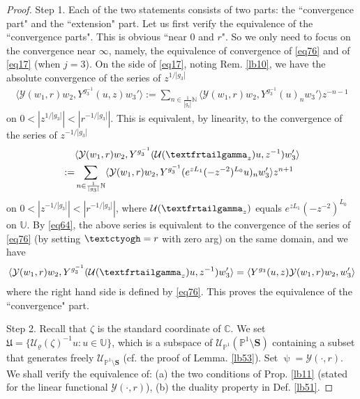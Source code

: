 \documentclass[11pt,b5paper,notitlepage]{article}
\theoremstyle{definition}
\theoremstyle{plain}
\newcommand{\fk}{\mathfrak}
\newcommand{\mc}{\mathcal}
\newcommand{\bk}[1]{\langle {#1}\rangle}
\newcommand{\scr}{\mathscr}
\newcommand{\Ubb}{\mathbb U}
\newcommand{\Cbb}{\mathbb C}
\newcommand{\Nbb}{\mathbb N}
\newcommand{\Pbb}{\mathbb P}
\newcommand{\Sbf}{\mathbf{S}}
\newcommand{\tipaz}{\text{\textctyogh}}
\newcommand{\tipxgamma}{\text{\textfrtailgamma}}
\numberwithin{equation}{subsection}
\begin{document}
\begin{proof}
Step 1. Each of the two statements consists of two parts: the ``convergence part" and the ``extension" part. Let us first verify the equivalence of the ``convergence parts". This is obvious ``near $0$ and $r$". So we only need to focus on the convergence  near $\infty$, namely, the equivalence of convergence of \eqref{eq76} and of \eqref{eq17} (when $j=3$). On the side of \eqref{eq17}, noting Rem. \ref{lb10}, we have the absolute  convergence of the series of $z^{1/|g_3|}$
\begin{align*}
\bk{\mc Y(w_1,r)w_2,Y^{g_3^{-1}}(u,z)w_3'}:=\sum_{n\in\frac 1{|g_3|}\Nbb}	\bk{\mc Y(w_1,r)w_2,Y^{g_3^{-1}}(u)_nw_3'}z^{-n-1}	
\end{align*}
on $0<|z^{1/|g_3|}|<|r^{-1/|g_3|}|$. This is equivalent, by linearity, to the convergence  of the series of $z^{-1/|g_3|}$
\begin{align*}
&\bk{\mc Y(w_1,r)w_2,Y^{g_3^{-1}}(\mc U(\tipxgamma_z)u,z^{-1})w_3'}\\
:=&\sum_{n\in\frac 1{|g_3|}\Nbb}	\bk{\mc Y(w_1,r)w_2,Y^{g_3^{-1}}(e^{zL_1}(-z^{-2})^{L_0}u)_nw_3'}z^{n+1}	
\end{align*}
on $0<|z^{-1/|g_3|}|<|r^{-1/|g_3|}|$, where $\mc U(\tipxgamma_z)$ equals $e^{zL_1}(-z^{-2})^{L_0}$ on $\Ubb$. By \eqref{eq64}, the above series is equivalent to the convergence of the series of \eqref{eq76} (by setting $\tipaz=r$ with zero arg) on the same domain, and we have
\begin{align}
\bk{\mc Y(w_1,r)w_2,Y^{g_3^{-1}}(\mc U(\tipxgamma_z)u,z^{-1})w_3'}=	\bk{Y^{g_3}(u,z)\mc Y(w_1,r)w_2,w_3'}\label{eq83}
\end{align}
where the right hand side is defined by \eqref{eq76}. This proves the equivalence of the ``convergence" part.

Step 2. Recall that $\zeta$ is the standard coordinate of $\Cbb$. We set $\fk U=\{\mc U_\varrho(\zeta)^{-1}u:u\in\Ubb\}$, which is a subspace of $\scr U_{\Pbb^1}(\Pbb^1\setminus\Sbf)$ containing a subset that generates freely $\scr U_{\Pbb^1\setminus\Sbf}$ (cf. the proof of Lemma. \ref{lb53}). Set $\uppsi=\mc Y(\cdot,r)$. We shall verify the equivalence of: (a) the two conditions of Prop. \ref{lb11} (stated for the linear functional $\mc Y(\cdot,r)$), (b) the duality property in Def. \ref{lb51}.


\end{proof}
\end{document}
